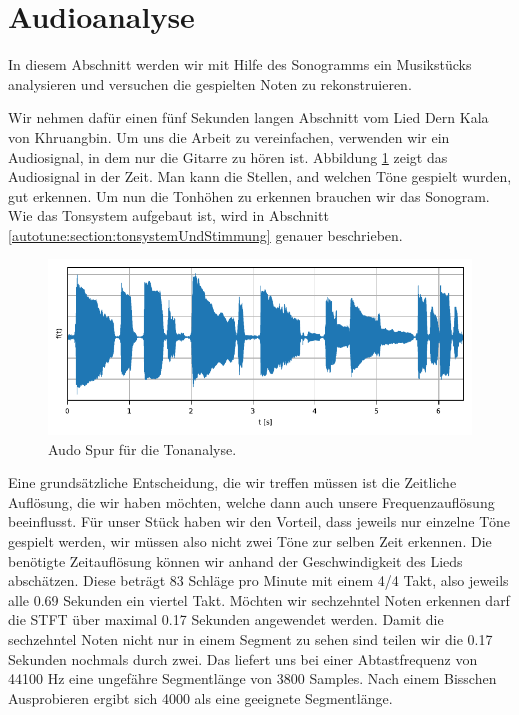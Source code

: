 %
%
%
%
\section{Audioanalyse
\label{sonogramm:section:teil2}}
In diesem Abschnitt werden wir mit Hilfe des Sonogramms ein Musikstücks
analysieren und versuchen die gespielten Noten zu rekonstruieren.

Wir nehmen dafür einen fünf Sekunden langen Abschnitt vom Lied
Dern Kala von Khruangbin.
Um uns die Arbeit zu vereinfachen, verwenden wir ein Audiosignal, in
dem nur die Gitarre zu hören ist.
Abbildung \ref{sonogramm:dernTime} zeigt das Audiosignal in der Zeit.
Man kann die Stellen, and welchen Töne gespielt wurden, gut erkennen.
Um nun die Tonhöhen zu erkennen brauchen wir das Sonogram.
Wie das Tonsystem aufgebaut ist, wird in Abschnitt \ref{autotune:section:tonsystemUndStimmung}
genauer beschrieben.
\begin{figure}
    \centering
    \includegraphics{papers/sonogramm/images/audioTimeDern.pdf}
    \caption{Audo Spur für die Tonanalyse.
    \label{sonogramm:dernTime}
    }
\end{figure}

Eine grundsätzliche Entscheidung, die wir treffen müssen
ist die Zeitliche Auflösung, die wir haben möchten, welche 
dann auch unsere Frequenzauflösung beeinflusst.
Für unser Stück haben wir den Vorteil, dass jeweils nur einzelne
Töne gespielt werden, wir müssen also nicht zwei Töne zur selben 
Zeit erkennen.
Die benötigte Zeitauflösung können wir anhand der Geschwindigkeit des Lieds abschätzen.
Diese beträgt 83 Schläge pro Minute mit einem 4/4 Takt, also jeweils alle 0.69 Sekunden ein viertel Takt.
Möchten wir sechzehntel Noten erkennen darf die STFT über maximal 0.17 Sekunden
angewendet werden.
Damit die sechzehntel Noten nicht nur in einem Segment zu sehen sind teilen
wir die 0.17 Sekunden nochmals durch zwei.
Das liefert uns bei einer Abtastfrequenz von 44100 Hz eine ungefähre Segmentlänge von 
3800 Samples. 
Nach einem Bisschen Ausprobieren ergibt sich 4000 als eine geeignete Segmentlänge.

